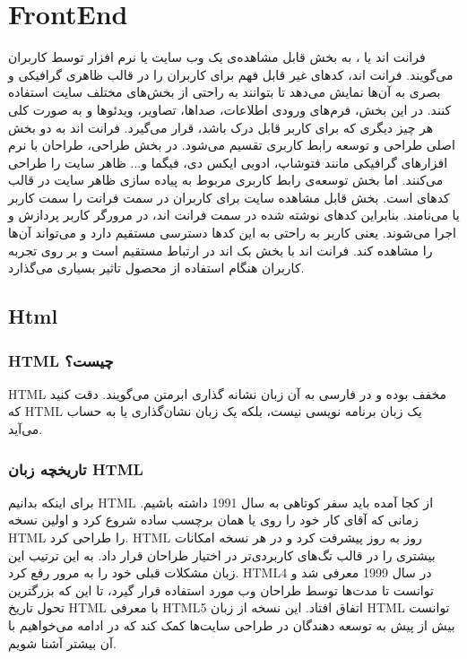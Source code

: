 \section{FrontEnd}
فرانت اند یا
، به بخش قابل مشاهده‌ی یک وب سایت یا نرم افزار توسط کاربران می‌گویند. فرانت اند، کدهای غیر قابل فهم برای کاربران را در قالب ظاهری گرافیکی و بصری به آن‌ها نمایش می‌دهد تا بتوانند به راحتی از بخش‌های مختلف سایت استفاده کنند. در این بخش، فرم‌های ورودی اطلاعات، صداها، تصاویر، ویدئوها و به صورت کلی هر چیز دیگری که برای کاربر قابل درک باشد، قرار می‌گیرد.
فرانت اند به دو بخش اصلی طراحی و توسعه رابط کاربری تقسیم می‌شود. در بخش طراحی، طراحان با نرم افزارهای گرافیکی مانند فتوشاپ، ادوبی ایکس دی، فیگما و... ظاهر سایت را طراحی می‌کنند. اما بخش توسعه‌ی رابط کاربری مربوط به پیاده سازی ظاهر سایت در قالب کدهای
است. بخش قابل مشاهده‌ سایت برای کاربران در سمت فرانت را سمت کاربر یا
 می‌نامند. بنابراین کدهای نوشته شده در سمت فرانت اند، در مرورگر کاربر پردازش و اجرا می‌شوند. یعنی کاربر به راحتی به این کدها دسترسی مستقیم دارد و می‌تواند آن‌ها را مشاهده کند. فرانت اند 
  با بخش بک اند 
   در ارتباط مستقیم است و بر روی تجربه کاربران هنگام استفاده از محصول تاثیر بسیاری می‌گذارد.

\subsection{Html}
\subsubsection{HTML چیست؟}
HTML
 مخفف 
 بوده و در فارسی به آن زبان نشانه‌ گذاری ابرمتن می‌گویند. دقت کنید که HTML یک زبان برنامه نویسی نیست، بلکه یک زبان نشان‌گذاری یا 
  به حساب می‌آید.

\subsubsection{تاریخچه زبان HTML}
برای اینکه بدانیم HTML از کجا آمده باید سفر کوتاهی به سال 1991 داشته باشیم. زمانی که آقای 
 کار خود را روی 
  یا همان برچسب ساده شروع کرد و اولین نسخه HTML را طراحی کرد. HTML روز به روز پیشرفت کرد و در هر نسخه امکانات بیشتری را در قالب تگ‌‌های کاربردی‌تر در اختیار طراحان قرار داد.
به این ترتیب این زبان مشکلات قبلی خود را به مرور رفع کرد. HTML4 در سال 1999 معرفی شد و توانست تا مدت‌ها توسط طراحان وب مورد استفاده قرار گیرد، تا این که بزرگترین تحول تاریخ HTML با معرفی HTML5 اتفاق افتاد. این نسخه از زبان HTML توانست بیش از پیش به توسعه دهندگان در طراحی سایت‌ها کمک کند که در ادامه می‌خواهیم با آن بیشتر آشنا شویم.



